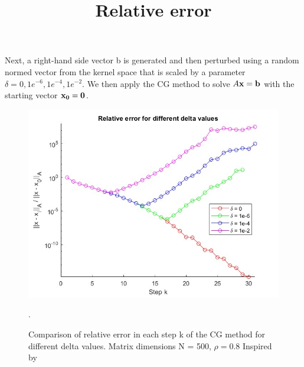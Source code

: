 Next, a right-hand side vector b is generated and then perturbed using a random normed vector from the kernel space that is scaled by a parameter \(\delta = {0, 1e^{-6},  1e^{-4}, 1e^{-2}}\). We then apply the CG method to solve \(A\bold{x}=\bold{b}\) with the starting vector \(\bold{x_0 = 0}\). 

\begin{figure}[ht]
\centering
\title{Relative error}
\includegraphics[width=\linewidth]{img/relative_error_different_delta_val.jpg}
\caption{Comparison of relative error in each step k of the CG method for different delta values. Matrix dimensions N = 500, \(\rho = 0.8\) Inspired by  \cite{Hayami08}}. 
\label{fig:relative error}
\end{figure}


